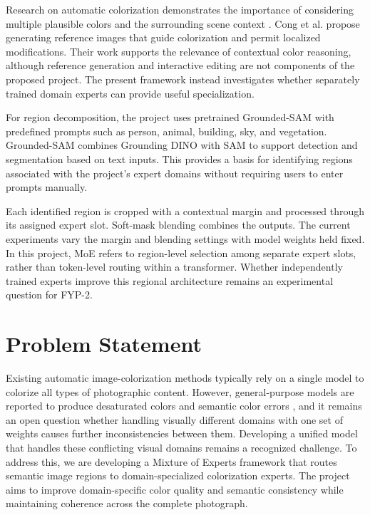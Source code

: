 \documentclass{FastFyp}
\begin{document}
Research on automatic colorization demonstrates the importance of considering multiple plausible colors and the surrounding scene context \cite{ref1,ref11}. Cong et al. \cite{ref11} propose generating reference images that guide colorization and permit localized modifications. Their work supports the relevance of contextual color reasoning, although reference generation and interactive editing are not components of the proposed project. The present framework instead investigates whether separately trained domain experts can provide useful specialization.

For region decomposition, the project uses pretrained Grounded-SAM \cite{ref17} with predefined prompts such as person, animal, building, sky, and vegetation. Grounded-SAM combines Grounding DINO \cite{liu2024groundingdino} with SAM \cite{kirillov2023sam} to support detection and segmentation based on text inputs. This provides a basis for identifying regions associated with the project's expert domains without requiring users to enter prompts manually.

Each identified region is cropped with a contextual margin and processed through its assigned expert slot. Soft-mask blending combines the outputs. The current experiments vary the margin and blending settings with model weights held fixed. In this project, MoE refers to region-level selection among separate expert slots, rather than token-level routing within a transformer. Whether independently trained experts improve this regional architecture remains an experimental question for FYP-2.
\section{Problem Statement}
Existing automatic image-colorization methods typically rely on a single model to colorize all types of photographic content. However, general-purpose models are reported to produce desaturated colors \cite{ref1,ref6} and semantic color errors \cite{ref9}, and it remains an open question whether handling visually different domains with one set of weights causes further inconsistencies between them. Developing a unified model that handles these conflicting visual domains remains a recognized challenge. To address this, we are developing a Mixture of Experts framework that routes semantic image regions to domain-specialized colorization experts. The project aims to improve domain-specific color quality and semantic consistency while maintaining coherence across the complete photograph.
\end{document}
